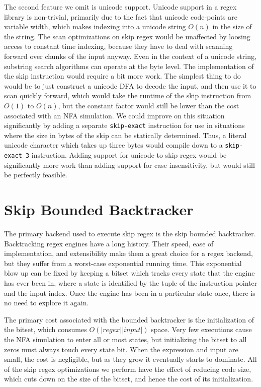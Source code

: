 The second feature we omit is unicode support. Unicode support in
a regex library is non-trivial, primarily due to the fact that
unicode code-points are variable width, which makes indexing into
a unicode string $O(n)$ in the size of the string. The scan optimizations
on skip regex would be unaffected by loosing access to constant time
indexing, because they have to deal
with scanning forward over chunks of the input anyway. Even in the
context of a unicode string, substring search algorithms can operate at
the byte level. The implementation of the skip instruction would require
a bit more work. The simplest thing to do would be to just construct
a unicode DFA to decode the input, and then use it to scan quickly
forward, which would take the runtime of the skip instruction from
$O(1)$ to $O(n)$, but the constant factor would still be lower
than the cost associated with an NFA simulation. We could improve on
this situation significantly by adding a separate \verb'skip-exact'
instruction for use in situations where the size in bytes of the
skip can be statically determined. Thus, a literal unicode character
which takes up three bytes would compile down to a \verb'skip-exact 3'
instruction. Adding support for unicode to skip regex would be significantly
more work than adding support for case insensitivity, but would still be
perfectly feasible.

\section{Skip Bounded Backtracker}

The primary backend used to execute skip regex is the skip bounded
backtracker. Backtracking regex engines have a long history.
Their speed, ease of implementation, and extensibility make them
a great choice for a regex backend, but they suffer from a worst-case
exponential running time. This exponential blow up can be fixed by
keeping a bitset which tracks every state that the engine has
ever been in, where a state is identified by the tuple of the
instruction pointer and the input index. Once the engine has
been in a particular state once, there is no need to explore it
again.

The primary cost associated with the bounded backtracker is
the initialization of the bitset, which consumes $O(|regex||input|)$
space. Very few executions cause the NFA simulation to enter all
or most states, but initializing the bitset to all zeros must always
touch every state bit. When the expression and input are small, the
cost is negligible, but as they grow it eventually starts to dominate.
All of the skip regex optimizations we perform have the effect of
reducing code size, which cuts down on the size of the bitset,
and hence the cost of its initialization.

